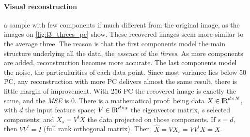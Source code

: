 \documentclass[a4paper, 10pt]{article}
\begin{document}
  \paragraph{Visual reconstruction} a sample with few components 
  if much different from the original image, as the images on 
  \autoref{fig:l3_threes_pc} show. These recovered images seem more similar 
  to the average three. %
  The reason is that the first components model the main structure underlying 
  all the data, the \emph{essence} of the \emph{threes}.
  As more components are added, reconstruction becomes more accurate.  The last 
  components model the noise, the particularities of each data point. Since
  most variance lies below 50 PC, any reconstruction with more PC delivers
  almost the same result, there is little margin of improvement. 
  With 256 PC the recovered image is exactly the same, and the \emph{MSE} is 0.
  There is a mathematical proof: being data $X \in {\rm I\!R}^{d \times N}$,
  with $d$ the input feature space; $V \in {\rm I\!R}^{d \times s}$ the
  eigenvector matrix, $s$ selected components; and $X_s=V^{t}X$ the data
  projected on those components. If $s=d$, then $VV^{t}=I$ (full rank orthogonal matrix).
  Then, $\hat{X} = VX_s = VV^{t}X = X$. 
  
\end{document}
